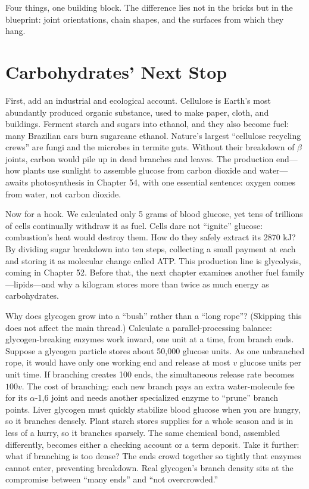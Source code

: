 Four things, one building block. The difference lies not in the bricks but in the blueprint: joint orientations, chain shapes, and the surfaces from which they hang.

\section{Carbohydrates' Next Stop}

First, add an industrial and ecological account. Cellulose is Earth's most abundantly produced organic substance, used to make paper, cloth, and buildings. Ferment starch and sugars into ethanol, and they also become fuel: many Brazilian cars burn sugarcane ethanol. Nature's largest ``cellulose recycling crews'' are fungi and the microbes in termite guts. Without their breakdown of $\beta$ joints, carbon would pile up in dead branches and leaves. The production end---how plants use sunlight to assemble glucose from carbon dioxide and water---awaits photosynthesis in Chapter 54, with one essential sentence: oxygen comes from water, not carbon dioxide.

Now for a hook. We calculated only 5 grams of blood glucose, yet tens of trillions of cells continually withdraw it as fuel. Cells dare not ``ignite'' glucose: combustion's heat would destroy them. How do they safely extract its 2870 kJ? By dividing sugar breakdown into ten steps, collecting a small payment at each and storing it as molecular change called ATP. This production line is glycolysis, coming in Chapter 52. Before that, the next chapter examines another fuel family---lipids---and why a kilogram stores more than twice as much energy as carbohydrates.

\begin{tiaozhan}
Why does glycogen grow into a ``bush'' rather than a ``long rope''? (Skipping this does not affect the main thread.) Calculate a parallel-processing balance: glycogen-breaking enzymes work inward, one unit at a time, from branch ends. Suppose a glycogen particle stores about 50,000 glucose units. As one unbranched rope, it would have only one working end and release at most $v$ glucose units per unit time. If branching creates 100 ends, the simultaneous release rate becomes $100v$. The cost of branching: each new branch pays an extra water-molecule fee for its $\alpha$-1,6 joint and needs another specialized enzyme to ``prune'' branch points. Liver glycogen must quickly stabilize blood glucose when you are hungry, so it branches densely. Plant starch stores supplies for a whole season and is in less of a hurry, so it branches sparsely. The same chemical bond, assembled differently, becomes either a checking account or a term deposit. Take it further: what if branching is too dense? The ends crowd together so tightly that enzymes cannot enter, preventing breakdown. Real glycogen's branch density sits at the compromise between ``many ends'' and ``not overcrowded.''
\end{tiaozhan}

